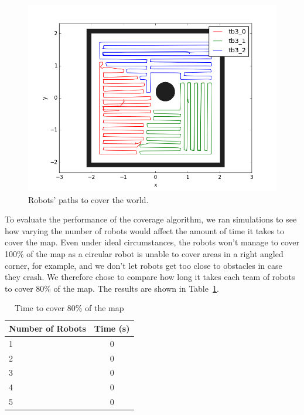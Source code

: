 \documentclass[a4paper, 10pt, conference]{ieeeconf}      %
\begin{document}
\begin{figure}
	\centering
	\includegraphics[width=\columnwidth]{ground_truth_coverage.png}
	\caption{Robots' paths to cover the world.}
	\label{fig:ground_truth_coverage}
\end{figure}

To evaluate the performance of the coverage algorithm, we ran simulations to see how varying the number of robots would affect the amount of time it takes to cover the map. Even under ideal circumstances, the robots won't manage to cover 100\% of the map as a circular robot is unable to cover areas in a right angled corner, for example, and we don't let robots get too close to obstacles in case they crash. We therefore chose to compare how long it takes each team of robots to cover 80\% of the map. The results are shown in Table~\ref{tab:table1}. 

\begin{table}[h!]
  \begin{center}
    \caption{Time to cover 80\% of the map}
    \label{tab:table1}
    \begin{tabular}{|l|c|}
      \hline
      \textbf{Number of Robots} & \textbf{Time (s)} \\
      \hline
      1 & 0\\
      2 & 0\\
      3 & 0\\
      4 & 0\\
      5 & 0\\
      \hline
    \end{tabular}
  \end{center}
\end{table}
\end{document}
